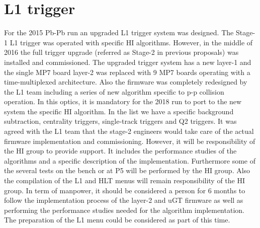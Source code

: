 \section{L1 trigger\label{sec:L1Trigger}}
For the 2015 Pb-Pb run an upgraded L1 trigger system was designed. The Stage-1 L1 trigger was operated with specific HI
algorithms. However, in the middle of 2016 the full trigger upgrade (referred as Stage-2 in previous proposals) was
installed and commissioned. The upgraded trigger system has a new layer-1 and the single MP7 board layer-2 was replaced
with 9 MP7 boards operating with a time-multiplexed architecture. Also the firmware was completely redesigned by the L1
team including a series of new algorithm specific to p-p collision operation. In this optics, it is mandatory for the
2018 run to port to the new system the specific HI algorithm. In the list we have a specific background subtraction,
centrality triggers, single-track triggers and Q2 triggers. It was agreed with the L1 team that the stage-2 engineers
would take care of the actual firmware implementation and commissioning. However, it will be responsibility of the HI
group to provide support. It includes the performance studies of the algorithms and a specific description of the
implementation. Furthermore some of the several tests on the bench or at P5 will be performed by the HI group. Also the
compilation of the L1 and HLT menus will remain responsibility of the HI group. In term of manpower, it should be
considered a person for 6 months to follow the implementation process of the layer-2 and uGT firmware as well as
performing the performance studies needed for the algorithm implementation. The preparation of the L1 menu could be
considered as part of this time. 





